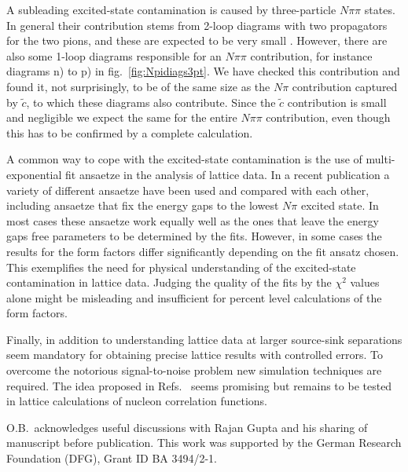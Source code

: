 \documentclass[11pt,prd,aps,showpacs,eqsecnum,floatfix,nofootinbib,preprint,tightenlines]{revtex4}
\begin{document}
A subleading excited-state contamination is caused by three-particle $N\pi\pi$ states. In general their contribution stems from 2-loop diagrams with two propagators for the two pions, and these are expected to be very small \cite{Bar:2018wco}. However, there are also some 1-loop diagrams responsible for an $N\pi\pi$ contribution, for instance diagrams n) to p) in fig.\ \ref{fig:Npidiags3pt}. We have checked this contribution and found it, not surprisingly, to be of the same size as the $N\pi$ contribution captured by $\tilde{c}$, to which these diagrams also contribute. Since the $\tilde{c}$ contribution is small and negligible we expect the same for the entire $N\pi\pi$ contribution, even though this has to be confirmed by a complete calculation.

A common way to cope with the excited-state contamination is the use of multi-exponential fit ansaetze in the analysis of lattice data. In a recent publication \cite{Park:2021ypf} a variety of different ansaetze have been used and compared with each other, including ansaetze that fix the energy gaps to the lowest $N\pi$ excited state. In most cases these ansaetze work equally well as the ones that leave the energy gaps free parameters to be determined by the fits. However, in some cases the results for the form factors differ significantly depending on the fit ansatz chosen. This exemplifies the need for physical understanding of the excited-state contamination in lattice data. Judging the quality of the fits by the $\chi^2$ values alone might be misleading and insufficient for percent level calculations of the form factors.

Finally, in addition to understanding lattice data at larger source-sink separations seem mandatory for obtaining precise lattice results with controlled errors. To overcome the notorious signal-to-noise problem new simulation techniques are required. The idea proposed in Refs.\ \cite{Ce:2016idq,Ce:2016ajy} seems promising but remains to be tested in lattice calculations of nucleon correlation functions.

\vspace{4ex}
O.B.\ acknowledges useful discussions with Rajan Gupta and his sharing of manuscript \cite{Park:2021ypf} before publication.
This work was supported by the German Research Foundation (DFG), Grant ID BA 3494/2-1.
\vspace{3ex}

\end{document}
